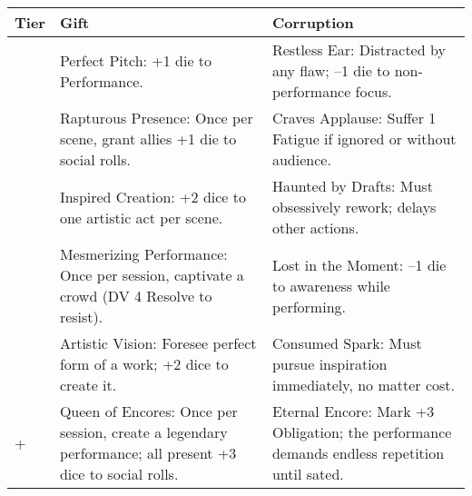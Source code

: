 \begin{longtable}{>{\raggedright\arraybackslash}p{1cm} p{5cm} p{5cm}}
\toprule
\textbf{Tier} & \textbf{Gift} & \textbf{Corruption} \\
\midrule
1 & Perfect Pitch: +1 die to Performance. & Restless Ear: Distracted by any flaw; --1 die to non-performance focus. \\
\midrule
2 & Rapturous Presence: Once per scene, grant allies +1 die to social rolls. & Craves Applause: Suffer 1 Fatigue if ignored or without audience. \\
\midrule
3 & Inspired Creation: +2 dice to one artistic act per scene. & Haunted by Drafts: Must obsessively rework; delays other actions. \\
\midrule
4 & Mesmerizing Performance: Once per session, captivate a crowd (DV 4 Resolve to resist). & Lost in the Moment: --1 die to awareness while performing. \\
\midrule
5 & Artistic Vision: Foresee perfect form of a work; +2 dice to create it. & Consumed Spark: Must pursue inspiration immediately, no matter cost. \\
\midrule
6+ & Queen of Encores: Once per session, create a legendary performance; all present +3 dice to social rolls. & Eternal Encore: Mark +3 Obligation; the performance demands endless repetition until sated. \\
\bottomrule
\end{longtable}